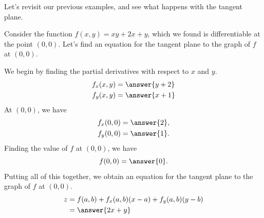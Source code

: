 \documentclass{ximera}
\begin{document}
Let's revisit our previous examples, and see what happens with the tangent plane.

\begin{example}
Consider the function $f(x,y) = xy+2x+y$, which we found is differentiable at the point $(0,0)$. Let's find an equation for the tangent plane to the graph of $f$ at $(0,0)$.

We begin by finding the partial derivatives with respect to $x$ and $y$.
\begin{align*}
f_x(x,y) &= \answer{y+2}\\
f_y(x,y) &= \answer{x+1}
\end{align*} 
At $(0,0)$, we have
\begin{align*}
f_x(0,0) &= \answer{2},\\
f_y(0,0) &= \answer{1}.
\end{align*} 
Finding the value of $f$ at $(0,0)$, we have
\[
f(0,0) = \answer{0}.
\]
Putting all of this together, we obtain an equation for the tangent plane to the graph of $f$ at $(0,0)$.
\begin{align*}
z &=f(a,b)+f_x(a,b)(x-a)+f_y(a,b)(y-b)\\
&= \answer{2x+y}
\end{align*}

\end{example}
\end{document}

